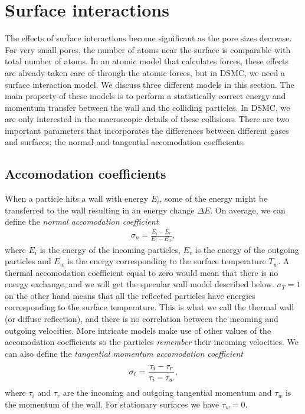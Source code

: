 \section{Surface interactions}
\label{sec:surface_interactions}
The effects of surface interactions become significant as the pore sizes decrease. For very small pores, the number of atoms near the surface is comparable with total number of atoms. In an atomic model that calculates forces, these effects are already taken care of through the atomic forces, but in DSMC, we need a surface interaction model. We discuss three different models in this section. The main property of these models is to perform a statistically correct energy and momentum transfer between the wall and the colliding particles. In DSMC, we are only interested in the macroscopic details of these collisions. There are two important parameters that incorporates the differences between different gases and surfaces; the normal and tangential accomodation coefficients.
\subsection{Accomodation coefficients}
\label{sec:accomodation_coefficients}
When a particle hits a wall with energy $E_i$, some of the energy might be transferred to the wall resulting in an energy change $\Delta E$. On average, we can define the \textit{normal accomodation coefficient} 
\begin{align}
	\sigma_n = \frac{E_i - E_r}{E_i - E_w},
\end{align}
where $E_i$ is the energy of the incoming particles, $E_r$ is the energy of the outgoing particles and $E_w$ is the energy corresponding to the surface temperature $T_w$. A thermal accomodation coefficient equal to zero would mean that there is no energy exchange, and we will get the specular wall model described below. $\sigma_T=1$ on the other hand means that all the reflected particles have energies corresponding to the surface temperature. This is what we call the thermal wall (or diffuse reflection\cite{karniadakis2005microflows}), and there is no correlation between the incoming and outgoing velocities. More intricate models make use of other values of the accomodation coefficients so the particles \textit{remember} their incoming velocities. We can also define the \textit{tangential momentum accomodation coefficient}
\begin{align}
	\sigma_t = {\tau_i - \tau_r\over \tau_i - \tau_w},
\end{align}
where $\tau_i$ and $\tau_r$ are the incoming and outgoing tangential momentum and $\tau_w$ is the momentum of the wall. For stationary surfaces we have $\tau_w=0$.

